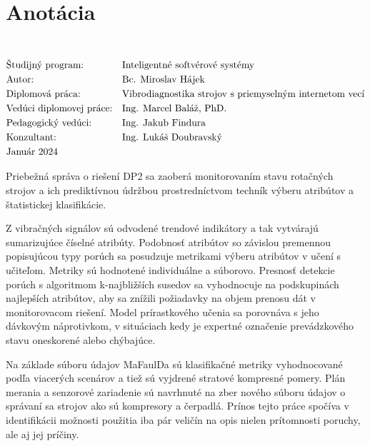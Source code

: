 \section*{Anotácia}
\University \\
\uppercase{\Faculty}
\vspace{-8pt}
{\setlength{\mathindent}{0cm}
\begin{align*}
&\text{Študijný program:} && \text{\StudyProgramme} \\
&\text{Autor:} && \text{\Author} \\
&\text{\Thesis:} && \text{\Title} \\
&\text{Vedúci diplomovej práce:} && \text{\Supervisor} \\
&\text{Pedagogický vedúci:} && \text{\DepartmentalAdvisor} \\
&\text{Konzultant:} && \text{\Consultant} \\
&\text{\Date}
\end{align*}}

Priebežná správa o riešení DP2 sa zaoberá monitorovaním stavu rotačných strojov a ich prediktívnou údržbou prostredníctvom techník výberu atribútov a štatistickej klasifikácie.

Z vibračných signálov sú odvodené trendové indikátory a tak vytvárajú sumarizujúce číselné atribúty. Podobnosť atribútov so závislou premennou popisujúcou typy porúch sa posudzuje metrikami výberu atribútov v učení s učiteľom. Metriky sú hodnotené individuálne a súborovo. Presnosť detekcie porúch s algoritmom k-najbližších susedov sa vyhodnocuje na podskupinách najlepších atribútov, aby sa znížili požiadavky na objem prenosu dát v monitorovacom riešení. Model prírastkového učenia sa porovnáva s jeho dávkovým náprotivkom, v situáciach kedy je expertné označenie prevádzkového stavu oneskorené alebo chýbajúce.

Na základe súboru údajov MaFaulDa sú klasifikačné metriky vyhodnocované podľa viacerých scenárov a tiež sú vyjdrené stratové kompresné pomery. Plán merania a senzorové zariadenie sú navrhnuté na zber nového súboru údajov o správaní sa strojov ako sú kompresory a čerpadlá. Prínos tejto práce spočíva v identifikácii možnosti použitia iba pár veličín na opis nielen prítomnosti poruchy, ale aj jej príčiny.
\emptypage